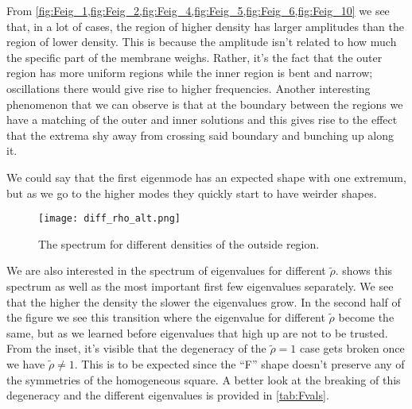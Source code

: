 \documentclass[10pt,a4paper,twocolumn]{article}
\begin{document}
\clearpage

From \cref{fig:Feig_1,fig:Feig_2,fig:Feig_4,fig:Feig_5,fig:Feig_6,fig:Feig_10} we see that, in a lot of cases, the region of higher density has larger amplitudes than the region of lower density. This is because the amplitude isn't related to how much the specific part of the membrane weighs. Rather, it's the fact that the outer region has more uniform regions while the inner region is bent and narrow; oscillations there would give rise to higher frequencies. Another interesting phenomenon that we can observe is that at the boundary between the regions we have a matching of the outer and inner solutions and this gives rise to the effect that the extrema shy away from crossing said boundary and bunching up along it.

We could say that the first eigenmode has an expected shape with one extremum, but as we go to the higher modes they quickly start to have weirder shapes.

\begin{figure}[!hb]
    \centering
    \texttt{[image: diff\_rho\_alt.png]}
    \caption{The spectrum for different densities of the outside region.}
    \label{fig:diff_rho}
\end{figure}

We are also interested in the spectrum of eigenvalues for different $\tilde{\rho}$.  shows this spectrum as well as the most important first few eigenvalues separately. We see that the higher the density the slower the eigenvalues grow. In the second half of the figure we see this transition where the eigenvalue for different $\tilde{\rho}$ become the same, but as we learned before eigenvalues that high up are not to be trusted. From the inset, it's visible that the degeneracy of the $\tilde{\rho}=1$ case gets broken once we have $\tilde{\rho} \neq 1$. This is to be expected since the ``F'' shape doesn't preserve any of the symmetries of the homogeneous square. A better look at the breaking of this degeneracy and the different eigenvalues is provided in \cref{tab:Fvals}.
\end{document}
